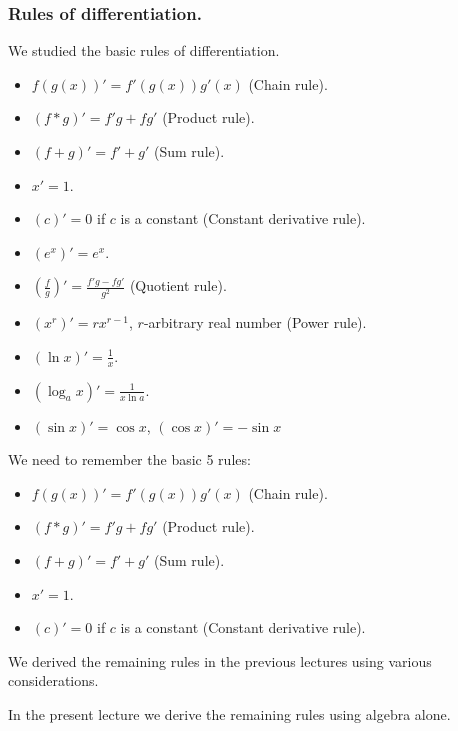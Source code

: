 \begin{frame}
\frametitle{Rules of differentiation.}
We studied the basic rules of differentiation.
\begin{itemize}
\item<1->\alert<14>{ $f (g(x))'=f'(g(x)) g'(x) $ (Chain rule). }
\item<2->\alert<14>{ $(f*g)'=f'g+fg'$ (Product rule).}
\item<3->\alert<14>{ $(f+g)'=f'+g'$ (Sum rule). }
\item<4->\alert<14>{ $x'=1$. }
\item<5->\alert<14>{ $(c)'=0$ if $c$ is a constant (Constant derivative rule).}
\end{itemize}
\begin{itemize}
\item<6->\alert<13>{ $(e^x)'=e^x$.}
\item<7->\alert<13>{ $\left(\frac{f}{g}\right)'=\frac{f' g-f g' }{g^2}$ (Quotient rule).}
\item<8->\alert<13>{ $(x^r)'=rx^{r-1} $, $r$-arbitrary real number (Power rule).}
\item<9->\alert<13>{ $(\ln x)'=\frac{1}x$.}
\item<10->\alert<13>{ $(\log_a x)'=\frac{1}{x\ln a}$.}
\item<11->\alert<13>{ $(\sin x)'=\cos x$, $(\cos x)'=-\sin x$}
\end{itemize}



\end{frame}
\begin{frame}
We need to remember the basic 5 rules:
\begin{itemize}
\item{ $f (g(x))'=f'(g(x)) g'(x) $ (Chain rule). }
\item{ $(f*g)'=f'g+fg'$ (Product rule).}
\item{ $(f+g)'=f'+g'$ (Sum rule). }
\item{ $x'=1$. }
\item{ $(c)'=0$ if $c$ is a constant (Constant derivative rule).}
\end{itemize}

We derived the remaining rules in the previous lectures using various considerations. 

In the present lecture we derive the remaining rules using algebra alone.

\end{frame}
